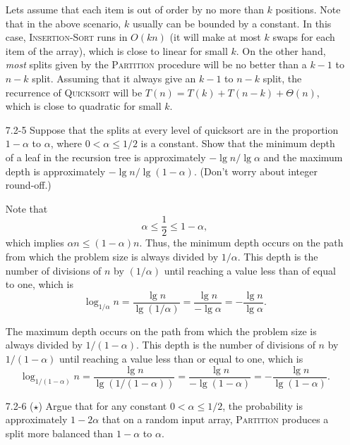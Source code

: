 \begin{enumerate}
\begin{framed}
Lets assume that each item is out of order by no more than $k$ positions. Note
that in the above scenario, $k$ usually can be bounded by a constant. In this
case, \textsc{Insertion-Sort} runs in $O(kn)$ (it will make at most $k$ swaps
for each item of the array), which is close to linear for small $k$. On the
other hand, \emph{most} splits given by the \textsc{Partition} procedure will
be no better than a $k - 1$ to $n - k$ split. Assuming that it always give an
$k - 1$ to $n - k$ split, the recurrence of \textsc{Quicksort} will be
$T(n) = T(k) + T(n - k) + \Theta(n)$, which is close to quadratic for small $k$.
\end{framed}

\item[7.2{-}5]{Suppose that the splits at every level of quicksort are in the
proportion $1 - \alpha$ to $\alpha$, where $0 < \alpha \le 1/2$ is a constant.
Show that the minimum depth of a leaf in the recursion tree is approximately
$- \lg n / \lg \alpha$ and the maximum depth is approximately
$- \lg n / \lg (1 - \alpha)$. (Don't worry about integer round-off.)}

\begin{framed}
Note that
\[
  \alpha \le \frac{1}{2} \le 1 - \alpha,
\]
which implies $\alpha n \le (1 - \alpha) n$. Thus, the minimum depth occurs on
the path from which the problem size is always divided by $1/\alpha$. This depth
is the number of divisions of $n$ by
$(1/\alpha)$ until reaching a value less than of equal to one, which is
\[
  \log_{1/\alpha} n = \frac{\lg n}{\lg (1/\alpha)}
                    = \frac{\lg n}{- \lg \alpha}
                    = - \frac{\lg n}{\lg \alpha}.
\]

The maximum depth occurs on the path from which the problem size is always
divided by $1/(1 - \alpha)$. This depth is the number of divisions of $n$ by
$1/(1 - \alpha)$ until reaching a value less than or equal to one, which is
\[
  \log_{1/(1 - \alpha)} n
  = \frac{\lg n}{\lg (1/(1 - \alpha))}
  = \frac{\lg n}{- \lg (1 - \alpha)} = - \frac{\lg n}{\lg (1 - \alpha)}.
\]

\end{framed}

\newpage

\item[7.2{-}6]{($\star$) Argue that for any constant $0 < \alpha \le 1/2$, the
probability is approximately $1 - 2\alpha$ that on a random input array,
\textsc{Partition} produces a split more balanced than $1 - \alpha$ to $\alpha$.}


\end{enumerate}
